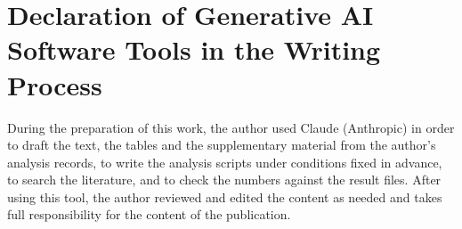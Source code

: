 \section*{Declaration of Generative AI Software Tools in the Writing Process}

During the preparation of this work, the author used Claude (Anthropic) in order to draft the text, the tables and
the supplementary material from the author's analysis records, to write the analysis scripts under conditions fixed
in advance, to search the literature, and to check the numbers against the result files. After using this tool, the author reviewed and edited the content as needed and takes full responsibility
for the content of the publication.
